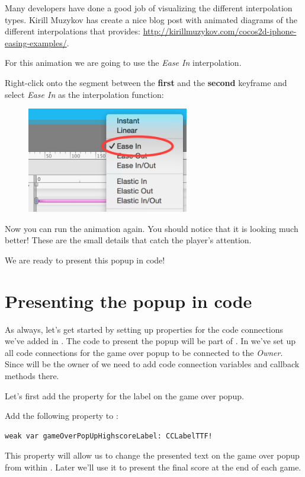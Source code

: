 Many developers have done a good job of visualizing the different interpolation
types. Kirill Muzykov has create a nice blog post with animated diagrams of the
different interpolations that \cocos{} provides:
\url{http://kirillmuzykov.com/cocos2d-iphone-easing-examples/}.

For this animation we are going to use the \textit{Ease In} interpolation.

\begin{leftbar}
Right-click onto the segment between the \textbf{first} and the \textbf{second}
keyframe and select \textit{Ease In} as the interpolation function:
\begin{figure}[H]
    \centering
    \includegraphics[width=200pt]{images/Chapter7/timeline_ease_in.png}
\end{figure}
\end{leftbar}

Now you can run the animation again. You should notice that it is looking much
better! These are the small details that catch the player's attention.

We are ready to present this popup in code!

\section{Presenting the popup in code}

As always, let's get started by setting up properties for the code connections
we've added in \SB{}. The code to present the popup will be part of 
. In \SB{} we've set up all code connections for the game
over popup to be connected to the \textit{Owner}. Since 
will be the owner of  we need to add code connection
variables and callback methods there.

Let's first add the property for the label on the game over popup.
\begin{leftbar}
Add the following property to :
\begin{lstlisting}
weak var gameOverPopUpHighscoreLabel: CCLabelTTF!
\end{lstlisting}
\end{leftbar}
This property will allow us to change the presented text on the game over popup
from within . Later we'll use it to present the final
score at the end of each game.


